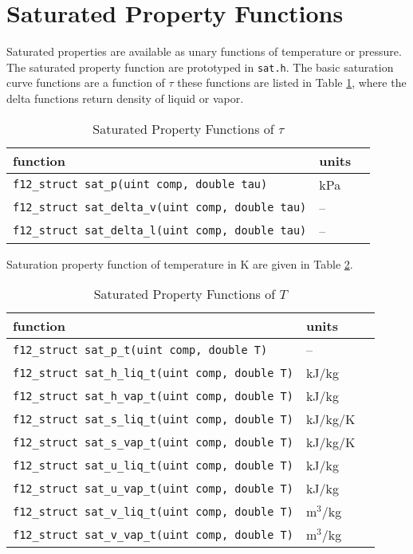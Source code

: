 \documentclass[oneside]{book}
\begin{document}
\clearpage

\section{Saturated Property Functions}

Saturated properties are available as unary functions of temperature or pressure.  The saturated property function are prototyped in \texttt{sat.h}.  The basic saturation curve functions are a function of $\tau$ these functions are listed in Table \ref{table:sat_props_tau}, where the delta functions return  density of liquid or vapor.  
\begin{table}[h!]
\centering
\caption{Saturated Property Functions of $\tau$}\label{table:sat_props_tau}
\begin{tabular}{ l l l }
\hline
function & units \\
\hline
\hline
\texttt{f12\_struct sat\_p(uint comp, double tau)} & kPa \\ [1ex]
\texttt{f12\_struct sat\_delta\_v(uint comp, double tau)} & -- \\ [1ex]
\texttt{f12\_struct sat\_delta\_l(uint comp, double tau)} & -- \\ [1ex]
 \hline    
\end{tabular}
\end{table}

Saturation property function of temperature in K are given in Table \ref{table:sat_props_t}.

\begin{table}[h!]
\centering
\caption{Saturated Property Functions of $T$}
\begin{tabular}{ l l l }
\hline
function & units \\
\hline
\hline
\texttt{f12\_struct sat\_p\_t(uint comp, double T)} & -- \\ [1ex]
\texttt{f12\_struct sat\_h\_liq\_t(uint comp, double T)} & kJ/kg \\ [1ex]
\texttt{f12\_struct sat\_h\_vap\_t(uint comp, double T)} & kJ/kg \\ [1ex]
\texttt{f12\_struct sat\_s\_liq\_t(uint comp, double T)} & kJ/kg/K \\ [1ex]
\texttt{f12\_struct sat\_s\_vap\_t(uint comp, double T)} & kJ/kg/K \\ [1ex]
\texttt{f12\_struct sat\_u\_liq\_t(uint comp, double T)} & kJ/kg \\ [1ex]
\texttt{f12\_struct sat\_u\_vap\_t(uint comp, double T)} & kJ/kg \\ [1ex]
\texttt{f12\_struct sat\_v\_liq\_t(uint comp, double T)} & m$^3$/kg \\ [1ex]
\texttt{f12\_struct sat\_v\_vap\_t(uint comp, double T)} & m$^3$/kg \\ [1ex]
 \hline    
\end{tabular}
\label{table:sat_props_t}
\end{table}
\end{document}
